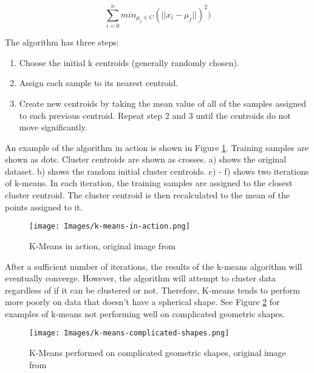 \begin{equation}
    \sum_{i=0}^nmin_{\mu_j\in C}(\vert\vert x_i - \mu_j \vert\vert)^2)
    \label{eq:wcss}
\end{equation}

The algorithm has three steps:

\begin{enumerate}
    \item Choose the initial k centroids (generally randomly chosen).
    \item Assign each sample to its nearest centroid.
    \item Create new centroids by taking the mean value of all of the samples assigned to each previous centroid. Repeat step 2 and 3 until the centroids do not move significantly.
\end{enumerate}

An example of the algorithm in action is shown in Figure \ref{fig:k-means}. Training samples are shown as dots. Cluster centroids are shown as crosses. a) shows the original dataset. b) shows the random initial cluster centroids. c) - f) shows two iterations of k-means. In each iteration, the training samples are assigned to the closest cluster centroid. The cluster centroid is then recalculated to the mean of the points assigned to it.

\begin{figure}[H]
\begin{center}
    \texttt{[image: Images/k-means-in-action.png]}
    \caption{K-Means in action, original image from \cite{k-means-stanford-notes}}
    \label{fig:k-means}
\end{center}
\end{figure}

After a sufficient number of iterations, the results of the k-means algorithm will eventually converge. However, the algorithm will attempt to cluster data regardless of if it can be clustered or not. Therefore, K-means tends to perform more poorly on data that doesn't have a spherical shape. See Figure \ref{fig:k-means-complicated-shapes} for examples of k-means not performing well on complicated geometric shapes. 

\begin{figure}[H]
\begin{center}
    \texttt{[image: Images/k-means-complicated-shapes.png]}
    \caption{K-Means performed on complicated geometric shapes, original image from \cite{k-means-towards-ds}}
    \label{fig:k-means-complicated-shapes}
\end{center}
\end{figure}

